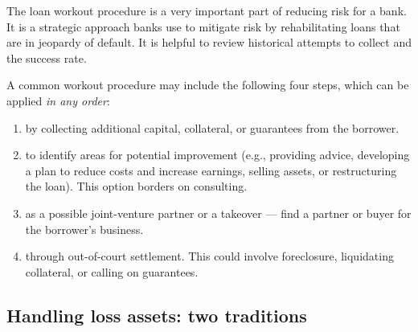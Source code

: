 
The loan workout procedure is a very important part of reducing risk for a bank.
It is a strategic approach banks use to mitigate risk by rehabilitating loans
that are in jeopardy of default. It is helpful to review historical attempts to
collect and the success rate.

A common workout procedure may include the following four steps, which can be
applied \emph{in any order}:

\begin{enumerate}
\item {} by collecting additional
capital, collateral, or guarantees from the borrower.
\item {} to identify areas for potential improvement
(e.g., providing advice, developing a plan to reduce costs and increase earnings,
selling assets, or restructuring the loan). This option borders on consulting.
\item {} as a possible joint-venture partner or a
takeover --- find a partner or buyer for the borrower's business.
\item {} through out-of-court settlement. This could involve
foreclosure, liquidating collateral, or calling on guarantees.
\end{enumerate}

\subsection*{Handling loss assets: two traditions}

